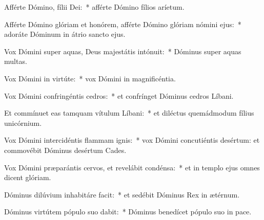 \item Afférte Dómino, fílii Dei:~* afférte Dómino fílios aríetum.

\item Afférte Dómino glóriam et honórem, afférte Dómino glóriam nómini ejus:~* adoráte Dóminum in átrio sancto ejus.

\item Vox Dómini super aquas, Deus majestátis intónuit:~* Dóminus super aquas multas.

\item Vox Dómini in virtúte:~* vox Dómini in magnificéntia.

\item Vox Dómini confringéntis cedros:~* et confrínget Dóminus cedros Líbani.

\item Et commínuet eas tamquam vítulum Líbani:~* et diléctus quemádmodum fílius unicórnium.

\item Vox Dómini intercidéntis flammam ignis:~* vox Dómini concutiéntis desértum: et commovébit Dóminus desértum Cades.

\item Vox Dómini præparántis cervos, et revelábit condénsa:~* et in templo ejus omnes dicent glóriam.

\item Dóminus dilúvium inhabitáre facit:~* et sedébit Dóminus Rex in ætérnum.

\item Dóminus virtútem pópulo suo dabit:~* Dóminus benedícet pópulo suo in pace.

